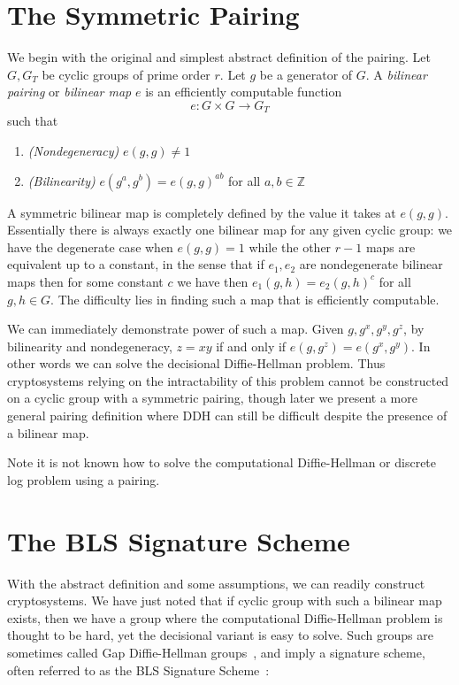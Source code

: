 \section{\label{sec:symmetricpairing}The Symmetric Pairing}

We begin with the original and simplest abstract definition of the pairing.
Let $G, G_T$ be cyclic groups of prime order $r$.
Let $g$ be a generator of $G$.
A \emph{bilinear pairing} or \emph{bilinear map}
$e$ is an efficiently computable function
\[
e:G \times G \rightarrow G_T
\]
such that
\begin{enumerate}
\item
\emph{(Nondegeneracy)}
$e(g,g) \ne 1$
\item
\emph{(Bilinearity)}
$e(g^a, g^b) = e(g,g)^{a b}$ for all $a, b \in \mathbb{Z}$
\end{enumerate}

A symmetric bilinear map is completely defined by the value it
takes at $e(g,g)$. Essentially there is always exactly one bilinear map
for any given cyclic group:
we have the degenerate case when $e(g,g)=1$
while the other $r-1$ maps are
equivalent up to a constant,
in the sense that if $e_1, e_2$ are nondegenerate bilinear maps then for
some constant $c$ we have
then $e_1(g,h) = e_2(g,h)^c$ for all $g,h \in G$.
The difficulty lies in finding such a map
that is efficiently computable.

We can immediately demonstrate power of such a map. Given
$g, g^x, g^y, g^z$, by bilinearity and nondegeneracy,
$z = x y$ if and only if
$e(g, g^z) = e(g^x, g^y)$. In other words we can solve the decisional
Diffie-Hellman problem.
Thus cryptosystems relying on the intractability of this
problem cannot be constructed on a cyclic group with
a symmetric pairing, though later we present a more general pairing
definition where DDH can still be difficult despite the presence of
a bilinear map.

Note it is not known how to solve the computational Diffie-Hellman
or discrete log problem using a pairing.

\section{The BLS Signature Scheme}

With the abstract definition and some assumptions,
we can readily construct cryptosystems.
We have just noted that if cyclic group with such a
bilinear map exists, then we have a group where the computational
Diffie-Hellman
problem is thought to be hard, yet the decisional variant is easy to solve.
Such groups are sometimes called Gap Diffie-Hellman groups~\cite{op}, and
imply a signature scheme,
often referred to as the BLS Signature Scheme~\cite{bls}:

